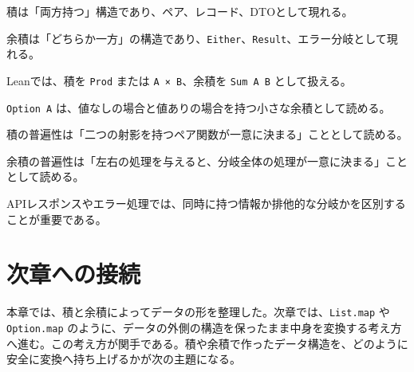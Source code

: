 積は「両方持つ」構造であり、ペア、レコード、DTOとして現れる。

余積は「どちらか一方」の構造であり、\texttt{Either}、\texttt{Result}、エラー分岐として現れる。

Leanでは、積を \texttt{Prod} または \texttt{A × B}、余積を \texttt{Sum A B} として扱える。

\texttt{Option A} は、値なしの場合と値ありの場合を持つ小さな余積として読める。

積の普遍性は「二つの射影を持つペア関数が一意に決まる」こととして読める。

余積の普遍性は「左右の処理を与えると、分岐全体の処理が一意に決まる」こととして読める。

APIレスポンスやエラー処理では、同時に持つ情報か排他的な分岐かを区別することが重要である。

\section{次章への接続}

本章では、積と余積によってデータの形を整理した。次章では、\texttt{List.map} や \texttt{Option.map} のように、データの外側の構造を保ったまま中身を変換する考え方へ進む。この考え方が関手である。積や余積で作ったデータ構造を、どのように安全に変換へ持ち上げるかが次の主題になる。
